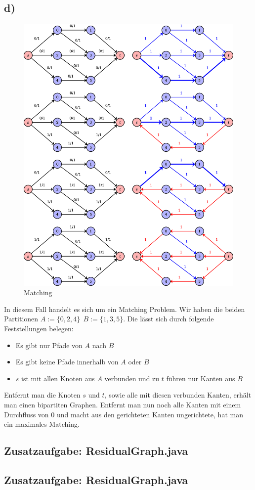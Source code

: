 \documentclass[a4paper,11pt,twoside]{scrartcl}
\begin{document}
\subsection*{d)}

\begin{figure}[H]
	\centering
	\includegraphics[width=0.75\linewidth]{Grafik/Diagramm2}
	\caption{Matching}
	\label{fig:Matching}
\end{figure}
In diesem Fall handelt es sich um ein Matching Problem. Wir haben die beiden Partitionen $A:=\{0,2,4\}~~B:=\{1,3,5\}$. Die lässt sich durch folgende Feststellungen belegen:
\begin{itemize}
	\item Es gibt nur Pfade von $A$ nach $B$
	\item Es gibt keine Pfade innerhalb von $A$ oder $B$
	\item $s$ ist mit allen Knoten aus $A$ verbunden und zu $t$ führen nur Kanten aus $B$
\end{itemize}
Entfernt man die Knoten $s$ und $t$, sowie alle mit diesen verbunden Kanten, erhält man einen bipartiten Graphen. Entfernt man nun noch alle Kanten mit einem Durchfluss von $0$ und macht aus den gerichteten Kanten ungerichtete, hat man ein maximales Matching.
\subsection*{Zusatzaufgabe: ResidualGraph.java}

\subsection*{Zusatzaufgabe: ResidualGraph.java}

\end{document}
